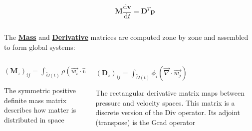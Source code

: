 \documentclass[8pt,xcolor=svgnames]{beamer}
\begin{document}
\begin{frame}
\begin{columns}
\begin{column}{0.2\textwidth}
  \scalebox{4}{$\longrightarrow$}
 \end{column}
 \begin{column}{0.175\textwidth}
 \begin{block}{}
 \centering
 \Large{$\mathbf{M}\dfrac{\mathrm{d}\mathbf{v}}{\mathrm{d}t}=\mathbf{D}^T\mathbf{p}$}
 \end{block}
 \end{column}
\end{columns}
The \textbf{\underline{Mass}} and \textbf{\underline{Derivative}} matrices are computed zone by zone and assembled to form global systems:
\begin{columns}[T]
\begin{column}{0.3\textwidth}
\centering
  \begin{block}{}
    \Large{$(\mathbf{M}_z)_{ij}=\int_{\tilde{\Omega}(t)} \rho(\vec{w_i}\cdot\vec{w_j})$}
  \end{block}
\tiny{The symmetric
positive definite mass
matrix describes how matter is
distributed in space}
 \end{column}
 \begin{column}{0.3\textwidth}
 \centering
  \begin{block}{}
    \Large{$(\mathbf{D}_z)_{ij}=\int_{\tilde{\Omega}(t)} \phi_i(\vec{\nabla}\cdot\vec{w_j})$}
  \end{block}
\tiny{The rectangular derivative matrix maps between
pressure and velocity spaces. This matrix is a
discrete version of the Div operator. Its adjoint
(transpose) is the Grad operator}
 \end{column}
\end{columns}
\end{frame}
\end{document}

